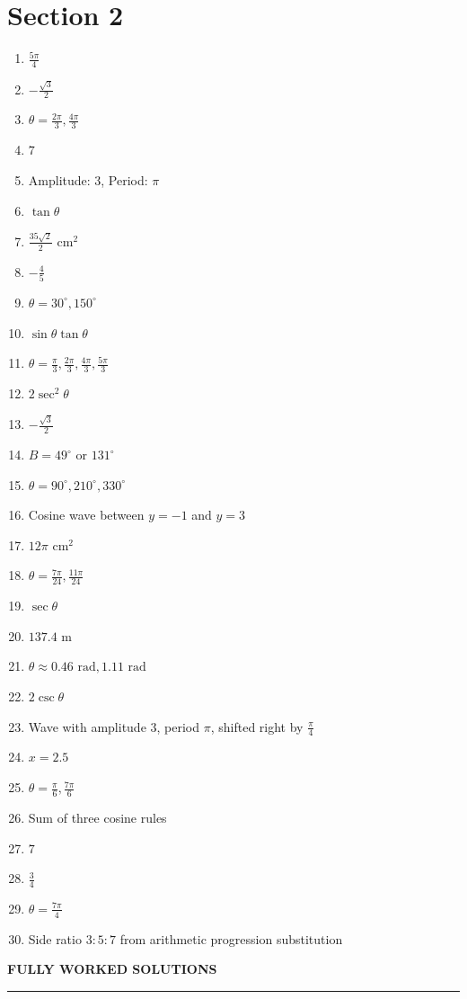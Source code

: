 \documentclass[11pt,a4paper]{article}
\begin{document}
\section*{Section 2}
\begin{enumerate}
    
    \item $\frac{5\pi}{4}$
    \item $-\frac{\sqrt{3}}{2}$
    \item $\theta = \frac{2\pi}{3}, \frac{4\pi}{3}$
    \item $7$
    \item Amplitude: $3$, Period: $\pi$
    \item $\tan \theta$
    \item $\frac{35\sqrt{2}}{2} \text{ cm}^2$
    \item $-\frac{4}{5}$
    \item $\theta = 30^\circ, 150^\circ$
    \item $\sin\theta\tan\theta$
    \item $\theta = \frac{\pi}{3}, \frac{2\pi}{3}, \frac{4\pi}{3}, \frac{5\pi}{3}$
    \item $2\sec^2 \theta$
    \item $-\frac{\sqrt{3}}{2}$
    \item $B = 49^\circ$ or $131^\circ$
    \item $\theta = 90^\circ, 210^\circ, 330^\circ$
    \item Cosine wave between $y=-1$ and $y=3$
    \item $12\pi \text{ cm}^2$
    \item $\theta = \frac{7\pi}{24}, \frac{11\pi}{24}$
    \item $\sec \theta$
    \item $137.4 \text{ m}$
    \item $\theta \approx 0.46 \text{ rad}, 1.11 \text{ rad}$
    \item $2\csc \theta$
    \item Wave with amplitude $3$, period $\pi$, shifted right by $\frac{\pi}{4}$
    \item $x = 2.5$
    \item $\theta = \frac{\pi}{6}, \frac{7\pi}{6}$
    \item Sum of three cosine rules
    \item $7$
    \item $\frac{3}{4}$
    \item $\theta = \frac{7\pi}{4}$
    \item Side ratio $3:5:7$ from arithmetic progression substitution
\end{enumerate}
\newpage
\begin{center}\Large \textbf{FULLY WORKED SOLUTIONS}\end{center}\vspace{0.2cm}\hrule\vspace{0.4cm}
\end{document}

